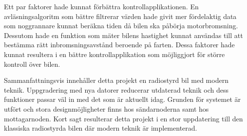 \documentclass[a4paper]{article}
\begin{document}
\vspace{5mm} \noindent
Ett par faktorer hade kunnat förbättra kontrollapplikationen. En avläsningsalgoritm som bättre filtrerar värden hade givit mer fördelaktig data som noggrannare kunnat beräkna tiden då bilen ska påbörja motorbromsning. Dessutom hade en funktion som mäter bilens hastighet kunnat användas till att bestämma rätt inbromsningsavstånd beroende på farten. Dessa faktorer hade kunnat resultera i en bättre kontrollapplikation som möjliggjort för större kontroll över bilen.



\vspace{5mm} \noindent
Sammanfattningsvis innehåller detta projekt en radiostyrd bil med modern teknik. Uppgradering med nya datorer reducerar utdaterad teknik och dess funktioner passar väl in med det som är aktuellt idag. Grunden för systemet är utfört och stora designmöjligheter finns hos sändarnoderna samt hos mottagarnoden. Kort sagt resulterar detta projekt i en stor uppdatering till den klassiska radiostyrda bilen där modern teknik är implementerad.




\newpage


\end{document}
